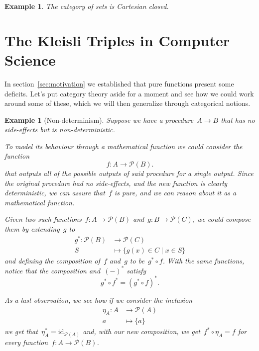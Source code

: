 \documentclass[a4paper]{article}
\theoremstyle{plain}
\newtheorem{example}[theorem]{Example}
\theoremstyle{definition}
\newcommand{\id}{\mathrm{id}}
\begin{document}
\begin{example}
    The category of sets is Cartesian closed.
\end{example}

\section{The Kleisli Triples in Computer Science}
\label{sec:kleisli-triple}
In section~\ref{sec:motivation} we established that pure functions present some
deficits. Let's put category theory aside for a moment and see how we could work
around some of these, which we will then generalize through categorical notions.
\begin{example}[Non-determinism]
    \label{ex:kleisli-non-determinism}
    Suppose we have a procedure~\(A\longrightarrow B\) that has no side-effects
    but is non-deterministic.

    To model its behaviour through a mathematical function we could consider the
    function
    \[
        f:A\longrightarrow\mathcal{P}(B).
    \]
    that outputs all of the possible outputs of said procedure for a single
    output. Since the original procedure had no side-effects, and the new
    function is clearly deterministic, we can assure that~\(f\) is pure, and we
    can reason about it as a mathematical function.

    Given two such functions~\(f:A\longrightarrow\mathcal{P}(B)\)
    and~\(g:B\longrightarrow\mathcal{P}(C)\), we could compose them by
    extending~\(g\) to
    \begin{align*}
        g^{\ast}:\mathcal{P}(B)&\longrightarrow\mathcal{P}(C) \\
        S&\longmapsto\{g(x)\in C \mid x\in S\}
    \end{align*}
    and defining the composition of~\(f\) and~\(g\) to be~\(g^{\ast} \circ f\).
    With the same functions, notice that the composition and~\((-)^{\ast}\)
    satisfy
    \[
        g^{\ast}\circ f^{\ast}
        = (g^{\ast} \circ f)^{\ast}.
    \]

    As a last observation, we see how if we consider the inclusion
    \begin{align*}
        \eta_{A}:A&\longrightarrow\mathcal{P}(A) \\
        a&\longmapsto\{a\}
    \end{align*}
    we get that~\(\eta_{A}^{\ast}=\id_{\mathcal{P}(A)}\) and, with our new
    composition, we get~\(f^{\ast}\circ\eta_{A}=f\) for every
    function~\(f:A\longrightarrow\mathcal{P}(B)\).
\end{example}
\end{document}
